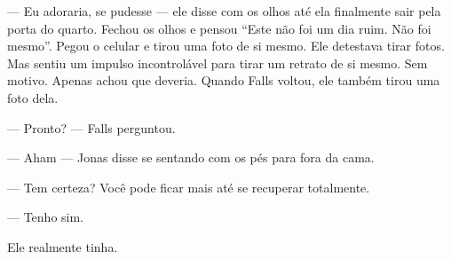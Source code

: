 --- Eu adoraria, se pudesse --- ele disse com os olhos até ela finalmente sair pela porta do quarto. Fechou os olhos e pensou ``Este não foi um dia ruim. Não foi mesmo''. Pegou o celular e tirou uma foto de si mesmo. Ele detestava tirar fotos. Mas sentiu um impulso incontrolável para tirar um retrato de si mesmo. Sem motivo. Apenas achou que deveria. Quando Falls voltou, ele também tirou uma foto dela.

--- Pronto? --- Falls perguntou.

--- Aham --- Jonas disse se sentando com os pés para fora da cama.

--- Tem certeza? Você pode ficar mais até se recuperar totalmente.

--- Tenho sim.

Ele realmente tinha.
